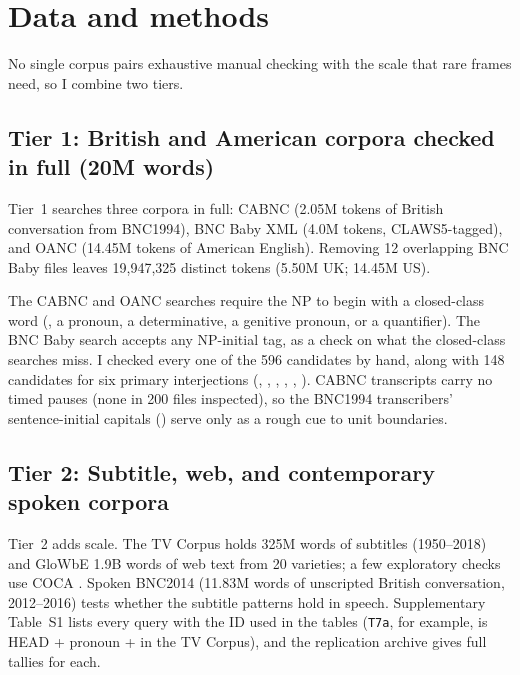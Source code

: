 \documentclass[12pt]{article}
\begin{document}
\section{Data and methods}
\label{sec:methods}

No single corpus pairs exhaustive manual checking with the scale that rare frames need, so I combine two tiers.

\subsection{Tier 1: British and American corpora checked in full (20M words)}
\label{sec:tier1-methods}

Tier~1 searches three corpora in full: CABNC \citep{albert2015cabnc} (2.05M tokens of British conversation from BNC1994), BNC Baby XML \citep{burnard2007bncbaby} (4.0M tokens, CLAWS5-tagged), and OANC \citep{ide2008oanc} (14.45M tokens of American English). Removing 12 overlapping BNC Baby files leaves 19,947,325 distinct tokens (5.50M UK; 14.45M US).

The CABNC and OANC searches require the NP to begin with a closed-class word (, a pronoun, a determinative, a genitive pronoun, or a quantifier). The BNC Baby search accepts any NP-initial tag, as a check on what the closed-class searches miss. I checked every one of the 596 candidates by hand, along with 148 candidates for six primary interjections (, , , , , ). CABNC transcripts carry no timed pauses (none in 200 files inspected), so the BNC1994 transcribers' sentence-initial capitals () serve only as a rough cue to unit boundaries.

\subsection{Tier 2: Subtitle, web, and contemporary spoken corpora}
\label{sec:tier2-methods}

Tier~2 adds scale. The TV Corpus \citep{davies2019tv} holds 325M words of subtitles (1950--2018) and GloWbE \citep{davies2013glowbe,daviesfuchs2015} 1.9B words of web text from 20 varieties; a few exploratory checks use COCA \citep{davies2020coca}. Spoken BNC2014 \citep{loveEtAl2017SpokenBNC2014} (11.83M words of unscripted British conversation, 2012--2016) tests whether the subtitle patterns hold in speech. Supplementary Table~S1 lists every query with the ID used in the tables (\texttt{T7a}, for example, is HEAD + pronoun +  in the TV Corpus), and the replication archive gives full tallies for each.
\end{document}
